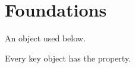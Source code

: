 \section{Foundations}
\begin{definition}\label{def:key}
An object used below.
\leanok
\end{definition}

\begin{theorem}\label{thm:main}
Every key object has the property.
\end{theorem}

